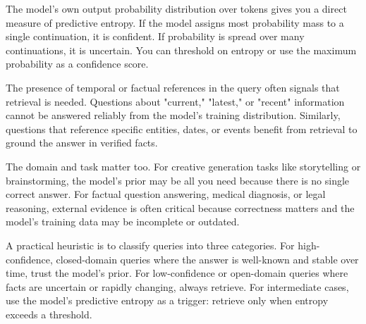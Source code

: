 The model's own output probability distribution over tokens gives you a direct measure of predictive entropy. If the model assigns most probability mass to a single continuation, it is confident. If probability is spread over many continuations, it is uncertain. You can threshold on entropy or use the maximum probability as a confidence score.

The presence of temporal or factual references in the query often signals that retrieval is needed. Questions about "current," "latest," or "recent" information cannot be answered reliably from the model's training distribution. Similarly, questions that reference specific entities, dates, or events benefit from retrieval to ground the answer in verified facts.

The domain and task matter too. For creative generation tasks like storytelling or brainstorming, the model's prior may be all you need because there is no single correct answer. For factual question answering, medical diagnosis, or legal reasoning, external evidence is often critical because correctness matters and the model's training data may be incomplete or outdated.

A practical heuristic is to classify queries into three categories. For high-confidence, closed-domain queries where the answer is well-known and stable over time, trust the model's prior. For low-confidence or open-domain queries where facts are uncertain or rapidly changing, always retrieve. For intermediate cases, use the model's predictive entropy as a trigger: retrieve only when entropy exceeds a threshold.

\vspace{1.5em}

